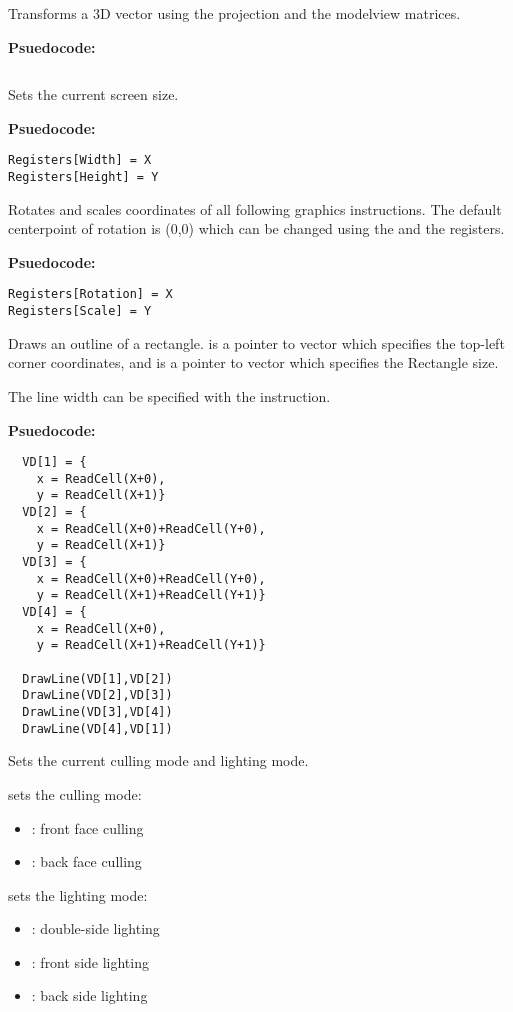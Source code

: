 Transforms a 3D vector using the projection and the modelview matrices.

\textbf{Psuedocode:}
\begin{verbatim}
\end{verbatim}


Sets the current screen size.

\textbf{Psuedocode:}
\begin{verbatim}
Registers[Width] = X
Registers[Height] = Y
\end{verbatim}


Rotates and scales coordinates of all following graphics instructions. The default centerpoint of rotation is (0,0) which can be changed using the  and the  registers.

\textbf{Psuedocode:}
\begin{verbatim}
Registers[Rotation] = X
Registers[Scale] = Y
\end{verbatim}


Draws an outline of a rectangle.  is a pointer to vector which specifies the top-left corner coordinates, and  is a pointer to vector which specifies the Rectangle size.

The line width can be specified with the  instruction.

\textbf{Psuedocode:}
\begin{verbatim}
  VD[1] = {
    x = ReadCell(X+0),
    y = ReadCell(X+1)}
  VD[2] = {
    x = ReadCell(X+0)+ReadCell(Y+0),
    y = ReadCell(X+1)}
  VD[3] = {
    x = ReadCell(X+0)+ReadCell(Y+0),
    y = ReadCell(X+1)+ReadCell(Y+1)}
  VD[4] = {
    x = ReadCell(X+0),
    y = ReadCell(X+1)+ReadCell(Y+1)}
  
  DrawLine(VD[1],VD[2])
  DrawLine(VD[2],VD[3])
  DrawLine(VD[3],VD[4])
  DrawLine(VD[4],VD[1])
\end{verbatim}


Sets the current culling mode and lighting mode.

 sets the culling mode:
\begin{itemize}
	\item {}: front face culling
	\item {}: back face culling
\end{itemize}

 sets the lighting mode:
\begin{itemize}
	\item {}: double-side lighting
	\item {}: front side lighting
	\item {}: back side lighting
\end{itemize}

